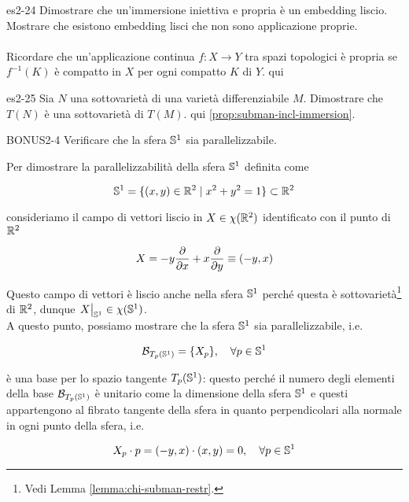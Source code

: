 
{es2-24}
{
Dimostrare che un'immersione iniettiva e propria è un embedding liscio. Mostrare che esistono embedding lisci che non sono applicazione proprie. \\ \\
Ricordare che un'applicazione continua $ f : X \to Y $ tra spazi topologici è propria se $ f^{-1}(K) $ è compatto in $ X $ per ogni compatto $ K $ di $ Y $.
}
{
qui
}


{es2-25}
{
Sia $ N $ una sottovarietà di una varietà differenziabile $ M $. Dimostrare che $ T(N) $ è una sottovarietà di $ T(M) $.
}
{
qui \ref{prop:subman-incl-immersion}.
}


{BONUS2-4}
{
Verificare che la sfera $ \S^{1} $ sia parallelizzabile.
}
{
Per dimostrare la parallelizzabilità della sfera $ \S^{1} $ definita come

\begin{equation}
	\S^{1} = \{ (x,y) \in \R^{2} \mid x^{2} + y^{2} = 1 \} \subset \R^{2}
\end{equation}

consideriamo il campo di vettori liscio in $ X \in \chi(\R^{2}) $ identificato con il punto di $ \R^{2} $

\begin{equation}
	X = - y \pdv{x} + x \pdv{y} \equiv (-y,x)
\end{equation}

Questo campo di vettori è liscio anche nella sfera $ \S^{1} $ perché questa è sottovarietà\footnote{%
	Vedi Lemma \ref{lemma:chi-subman-restr}.%
} di $ \R^{2} $, dunque $ \eval{X}_{\S^{1}} \in \chi(\S^{1}) $. \\
A questo punto, possiamo mostrare che la sfera $ \S^{1} $ sia parallelizzabile, i.e.

\begin{equation}
	\B_{T_{p}(\S^{1})} = \{ X_{p} \} \qcomma \forall p \in \S^{1}
\end{equation}

è una base per lo spazio tangente $ T_{p}(\S^{1}) $: questo perché il numero degli elementi della base $ \B_{T_{p}(\S^{1})} $ è unitario come la dimensione della sfera $ \S^{1} $ e questi appartengono al fibrato tangente della sfera in quanto perpendicolari alla normale in ogni punto della sfera, i.e.

\begin{equation}
	X_{p} \cdot p = (-y,x) \cdot (x,y) = 0 \qcomma \forall p \in \S^{1}
\end{equation}
}

